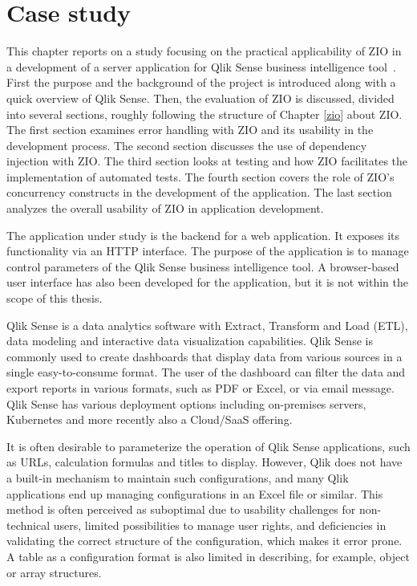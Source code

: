 \chapter{Case study}
This chapter reports on a study focusing on the practical applicability of ZIO in a development of a server application for Qlik Sense business intelligence tool~\cite{qlik-sense}. First the purpose and the background of the project is introduced along with a quick overview of Qlik Sense. Then, the evaluation of ZIO is discussed, divided into several sections, roughly following the structure of Chapter \ref{zio} about ZIO. The first section examines error handling with ZIO and its usability in the development process. The second section discusses the use of dependency injection with ZIO. The third section looks at testing and how ZIO facilitates the implementation of automated tests. The fourth section covers the role of ZIO's concurrency constructs in the development of the application. The last section analyzes the overall usability of ZIO in application development.

The application under study is the backend for a web application. It exposes its functionality via an HTTP interface. The purpose of the application is to manage control parameters of the Qlik Sense business intelligence tool. A browser-based user interface has also been developed for the application, but it is not within the scope of this thesis.

Qlik Sense is a data analytics software with Extract, Transform and Load (ETL), data modeling and interactive data visualization capabilities. Qlik Sense is commonly used to create dashboards that display data from various sources in a single easy-to-consume format. The user of the dashboard can filter the data and export reports in various formats, such as PDF or Excel, or via email message. Qlik Sense has various deployment options including on-premises servers, Kubernetes and more recently also a Cloud/SaaS offering.

It is often desirable to parameterize the operation of Qlik Sense applications, such as URLs, calculation formulas and titles to display. However, Qlik does not have a built-in mechanism to maintain such configurations, and many Qlik applications end up managing configurations in an Excel file or similar. This method is often perceived as suboptimal due to usability challenges for non-technical users, limited possibilities to manage user rights, and deficiencies in validating the correct structure of the configuration, which makes it error prone. A table as a configuration format is also limited in describing, for example, object or array structures.


